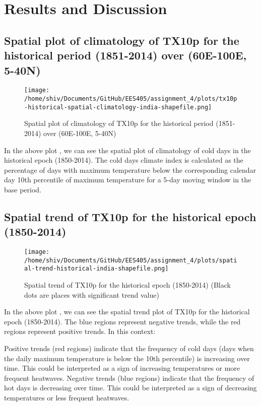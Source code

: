 \documentclass[a4paper, 12pt, twoside]{report}
\begin{document}
\chapter{Results and Discussion}

\section{Spatial plot of climatology of TX10p for the historical period (1851-2014) over (60E-100E, 5-40N)}

\begin{figure}[htb]
    \centering
    \texttt{[image: /home/shiv/Documents/GitHub/EES405/assignment\_4/plots/tx10p-historical-spatial-climatology-india-shapefile.png]}
    \caption{\centering Spatial plot of climatology of TX10p for the historical period (1851-2014) over (60E-100E, 5-40N)}
    \label{fig:TX10p_spatial}
\end{figure}

In the above plot , we can see the spatial plot of climatology of cold days in the historical epoch (1850-2014). The cold days climate index is calculated as the percentage of days with maximum temperature below the corresponding calendar day 10th percentile of maximum temperature for a 5-day moving window in the base period.


\section{Spatial trend of TX10p for the historical epoch (1850-2014)}

\begin{figure}[h]
    \centering
    \texttt{[image: /home/shiv/Documents/GitHub/EES405/assignment\_4/plots/spatial-trend-historical-india-shapefile.png]}
    \caption{\centering Spatial trend of TX10p for the historical epoch (1850-2014) (Black dots are places with significant trend value)}
    \label{fig:TX10p_spatial_trend}
\end{figure}

In the above plot , we can see the spatial trend plot of TX10p for the historical epoch (1850-2014). The blue regions represent negative trends, while the red regions represent positive trends. In this context:

Positive trends (red regions) indicate that the frequency of cold days (days when the daily maximum temperature is below the 10th percentile) is increasing over time. This could be interpreted as a sign of increasing temperatures or more frequent heatwaves.
Negative trends (blue regions) indicate that the frequency of hot days is decreasing over time. This could be interpreted as a sign of decreasing temperatures or less frequent heatwaves.
\end{document}
